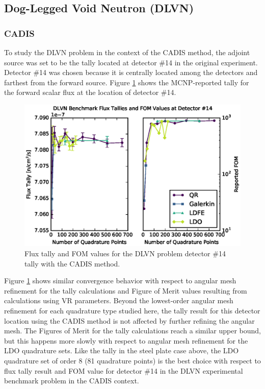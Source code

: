 \documentclass{article} %
\begin{document}
\FloatBarrier
\subsection{Dog-Legged Void Neutron (DLVN)}

\subsubsection{CADIS}

To study the DLVN problem in the context of the CADIS method, the adjoint
source was set to be the tally located at detector \#14 in the original
experiment. Detector \#14 was chosen because it is centrally located among the
detectors and farthest from the forward source. Figure \ref{dlvn-cadis}
shows the MCNP-reported tally for the forward scalar flux at the location of
detector \#14.

\begin{figure}[!htb]
\centering
\includegraphics[max height=0.445\textheight]{dlvn-cadis.eps}
\caption{Flux tally and FOM values for the DLVN problem detector \#14 tally
         with the CADIS method.}
\label{dlvn-cadis}
\end{figure}

Figure \ref{dlvn-cadis} shows similar convergence
behavior with respect to angular mesh refinement for the tally calculations
and Figure of Merit values resulting from calculations using VR parameters.
Beyond the lowest-order angular mesh refinement for each quadrature type
studied here, the tally result for this detector location using the CADIS
method is not affected by further refining the angular mesh. The Figures of
Merit for the tally calculations reach a similar upper bound, but this happens
more slowly with respect to angular mesh refinement for the LDO quadrature
sets. Like the tally in the steel plate case above, the LDO quadrature set of
order 8 (81 quadrature points) is the best choice with respect to flux tally
result and FOM value for detector \#14 in the DLVN experimental benchmark
problem in the CADIS context.
\end{document}

